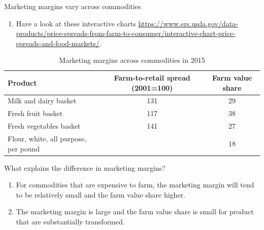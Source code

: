 \documentclass[table,xcolor=pdftex,dvipsnames, handout]{beamer}\usepackage[]{graphicx}\usepackage[]{color}
\begin{document}
\begin{frame}{Marketing margins vary across commodities}
\begin{enumerate}[label=\textbullet]
  \item Have a look at these interactive charts \url{https://www.ers.usda.gov/data-products/price-spreads-from-farm-to-consumer/interactive-chart-price-spreads-and-food-markets/}.
\end{enumerate}
\begin{table}
\caption{Marketing margins across commodities in 2015}
\small
\begin{tabular}{l c c}
  \toprule
  Product & \parbox[c]{0.85in}{\centering Farm-to-retail spread (2001=100)} & \parbox[c]{0.85in}{\centering Farm value share} \\
  \midrule
   Milk and dairy basket & 131 &  29 \\
   Fresh fruit basket & 117 & 38 \\
   Fresh vegetables basket & 141 & 27 \\
   Flour, white, all purpose, per pound &  & 18 \\
  \bottomrule
\end{tabular}
\end{table}
\end{frame}



\begin{frame}{What explains the difference in marketing margins?}
\begin{enumerate}[label=\textbullet]
  \item For commodities that are expensive to farm, the marketing margin will tend to be relatively small and the farm value share higher.
  \item The marketing margin is large and the farm value share is small for product that are substantially transformed.
\end{enumerate}
\end{frame}

\end{document}
